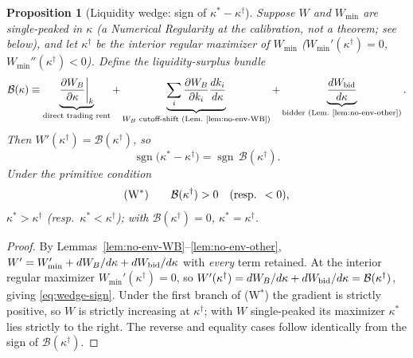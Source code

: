 \documentclass[11pt]{article}
\newtheorem{proposition}{Proposition}
\newcommand{\1}{\mathbf{1}}
\begin{document}
\begin{proposition}[Liquidity wedge: sign of $\kappa^{\ast}-\kappa^{\dagger}$]
\label{prop:planner-wedge}
Suppose $W$ and $W_{\min}$ are single-peaked in $\kappa$ \emph{(a Numerical
Regularity at the calibration, not a theorem; see below)}, and let
$\kappa^{\dagger}$ be the interior regular maximizer of $W_{\min}$
($W_{\min}'(\kappa^{\dagger})=0$, $W_{\min}''(\kappa^{\dagger})<0$). Define the
\emph{liquidity-surplus bundle}
\begin{equation}
\mathcal B(\kappa)\equiv
\underbrace{\frac{\partial W_B}{\partial\kappa}\bigg|_{k}}_{\text{direct trading rent}}
+\underbrace{\sum_{i}\frac{\partial W_B}{\partial k_i}\frac{dk_i}{d\kappa}}_{\text{$W_B$ cutoff-shift (Lem.~\ref{lem:no-env-WB})}}
+\underbrace{\frac{dW_{\textup{bid}}}{d\kappa}}_{\text{bidder (Lem.~\ref{lem:no-env-other})}}.
\label{eq:bundle}
\end{equation}
Then $W'(\kappa^{\dagger})=\mathcal B(\kappa^{\dagger})$, so
\begin{equation}
\operatorname{sgn}\big(\kappa^{\ast}-\kappa^{\dagger}\big)
   =\operatorname{sgn}\,\mathcal B(\kappa^{\dagger}).
\label{eq:wedge-sign}
\end{equation}
Under the primitive condition
\begin{equation}
\textup{(W$^{\ast}$)}\qquad \mathcal B(\kappa^{\dagger})>0
\quad(\text{resp. }<0),
\label{eq:Wstar}
\end{equation}
$\kappa^{\ast}>\kappa^{\dagger}$ (resp.\ $\kappa^{\ast}<\kappa^{\dagger}$);
with $\mathcal B(\kappa^{\dagger})=0$, $\kappa^{\ast}=\kappa^{\dagger}$.
\end{proposition}

\begin{proof}
By Lemmas~\ref{lem:no-env-WB}--\ref{lem:no-env-other},
$W'=W_{\min}'+dW_B/d\kappa+dW_{\textup{bid}}/d\kappa$ with \emph{every} term
retained. At the interior regular maximizer $W_{\min}'(\kappa^{\dagger})=0$, so
$W'(\kappa^{\dagger})=dW_B/d\kappa+dW_{\textup{bid}}/d\kappa
=\mathcal B(\kappa^{\dagger})$, giving \eqref{eq:wedge-sign}. Under the first
branch of (W$^{\ast}$) the gradient is strictly positive, so $W$ is strictly
increasing at $\kappa^{\dagger}$; with $W$ single-peaked its maximizer
$\kappa^{\ast}$ lies strictly to the right. The reverse and equality cases follow
identically from the sign of $\mathcal B(\kappa^{\dagger})$.
\end{proof}
\end{document}
